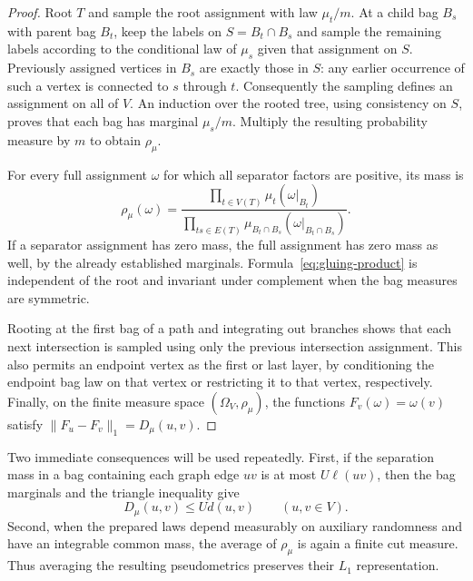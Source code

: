 \begin{proof}
Root $T$ and sample the root assignment with law $\mu_t/m$.
At a child bag $B_s$ with parent bag $B_t$, keep the labels on
$S=B_t\cap B_s$ and sample the remaining labels according to the
conditional law of $\mu_s$ given that assignment on $S$.
Previously assigned vertices in $B_s$ are exactly those in $S$: any
earlier occurrence of such a vertex is connected to $s$ through $t$.
Consequently the sampling defines an assignment on all of $V$.
An induction over the rooted tree, using consistency on $S$, proves that
each bag has marginal $\mu_s/m$.
Multiply the resulting probability measure by $m$ to obtain $\rho_\mu$.

For every full assignment $\omega$ for which all separator factors are
positive, its mass is
\begin{equation}\label{eq:gluing-product}
 \rho_\mu(\omega)
 =\frac{\displaystyle\prod_{t\in V(T)}\mu_t(\omega|_{B_t})}
        {\displaystyle\prod_{ts\in E(T)}
          \mu_{B_t\cap B_s}(\omega|_{B_t\cap B_s})}.
\end{equation}
If a separator assignment has zero mass, the full assignment has zero
mass as well, by the already established marginals.
Formula~\eqref{eq:gluing-product} is independent of the root and
invariant under complement when the bag measures are symmetric.

Rooting at the first bag of a path and integrating out branches shows
that each next intersection is sampled using only the previous
intersection assignment. This also permits an endpoint vertex as the
first or last layer, by conditioning the endpoint bag law on that
vertex or restricting it to that vertex, respectively.
Finally, on the finite measure space $(\Omega_V,\rho_\mu)$, the functions
$F_v(\omega)=\omega(v)$ satisfy
$\|F_u-F_v\|_1=D_\mu(u,v)$.
\end{proof}

Two immediate consequences will be used repeatedly.
First, if the separation mass in a bag containing each graph edge
$uv$ is at most $U\ell(uv)$, then the bag marginals and the triangle
inequality give
\begin{equation}\label{eq:edge-extension}
 D_\mu(u,v)\leq U d(u,v)\qquad(u,v\in V).
\end{equation}
Second, when the prepared laws depend measurably on auxiliary randomness
and have an integrable common mass, the average of $\rho_\mu$ is again
a finite cut measure. Thus averaging the resulting pseudometrics
preserves their $L_1$ representation.


